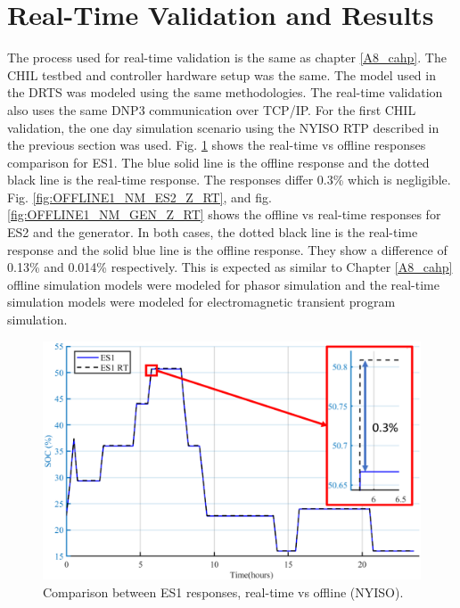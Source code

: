 \section{Real-Time Validation and Results}
The process used for real-time validation is the same as chapter \ref{A8_cahp}. The CHIL testbed and controller hardware setup was the same. The model used in the DRTS was modeled using the same methodologies. The real-time validation also uses the same DNP3 communication over TCP/IP. For the first CHIL validation, the one day simulation scenario using the NYISO RTP described in the previous section was used. Fig. \ref{fig:OFFLINE1_NM_ES1_Z_RT} shows the real-time vs offline responses comparison for ES1. The blue solid line is the offline response and the dotted black line is the real-time response. The responses differ 0.3\% which is negligible. Fig. \ref{fig:OFFLINE1_NM_ES2_Z_RT}, and fig. \ref{fig:OFFLINE1_NM_GEN_Z_RT} shows the offline vs real-time responses for ES2 and the generator. In both cases, the dotted black line is the real-time response and the solid blue line is the offline response. They show a difference of 0.13\% and 0.014\% respectively. This is expected as similar to Chapter \ref{A8_cahp} offline simulation models were modeled for phasor simulation and the real-time simulation models were modeled for electromagnetic transient program simulation.

\begin{figure}[!ht]
\centering
\includegraphics[width = \linewidth]{figs/A82/OFFLINE1_NM_ES1_Z_RT.png}
\caption{Comparison between ES1 responses, real-time vs offline (NYISO).}
\label{fig:OFFLINE1_NM_ES1_Z_RT}
\end{figure}

